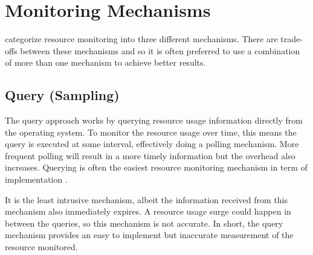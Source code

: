 \section{Monitoring Mechanisms}
\label{sec:resource.mechanisms}

\citet{juvePracticalResourceMonitoring2015} categorize resource monitoring into three different mechanisms.
There are trade-offs between these mechanisms and so it is often preferred to use a combination of more than one mechanism to achieve better results.

\subsection{Query (Sampling)}

The query approach works by querying resource usage information directly from the operating system.
To monitor the resource usage over time, this means the query is executed at some interval, effectively doing a polling mechanism.
More frequent polling will result in a more timely information but the overhead also increases.
Querying is often the easiest resource monitoring mechanism in term of implementation \citep{juvePracticalResourceMonitoring2015}.

It is the least intrusive mechanism, albeit the information received from this mechanism also immediately expires.
A resource usage surge could happen in between the queries, so this mechanism is not accurate.
In short, the query mechanism provides an easy to implement but inaccurate measurement of the resource monitored.

